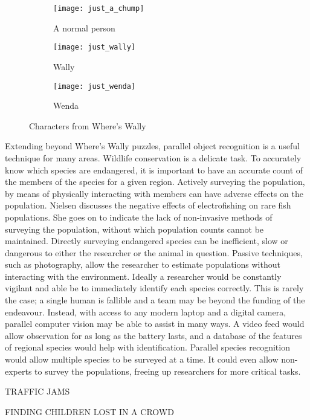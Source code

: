 \documentclass[../main.tex]{subfiles}
\begin{document}
    \begin{figure}[h]
    \centering
      \begin{subfigure}[b]{0.3\textwidth}
        \centering
        \texttt{[image: just\_a\_chump]}   
        \caption{A normal person}
        \label{justachump}
      \end{subfigure}
      \begin{subfigure}[b]{0.3\textwidth}
        \centering
        \texttt{[image: just\_wally]}   
        \caption{Wally}
        \label{justwally}
      \end{subfigure}
      \begin{subfigure}[b]{0.3\textwidth}
        \centering
        \texttt{[image: just\_wenda]}   
        \caption{Wenda}
        \label{justwenda}
      \end{subfigure}
    \caption{Characters from Where's Wally}
    \label{wallychars}
    \end{figure}

    Extending beyond Where's Wally puzzles, parallel object recognition is a useful technique for many areas.
    Wildlife conservation is a delicate task.
    To accurately know which species are endangered, it is important to have an accurate count of the members of the species for a given region.
    Actively surveying the population, by means of physically interacting with members can have adverse effects on the population.
    Nielsen \cite{electrofishing} discusses the negative effects of electrofishing on rare fish populations.
    She goes on to indicate the lack of non-invasive methods of surveying the population, without which population counts cannot be maintained.
    Directly surveying endangered species can be inefficient, slow or dangerous to either the researcher or the animal in question.
    Passive techniques, such as photography, allow the researcher to estimate populations without interacting with the environment.
    Ideally a researcher would be constantly vigilant and able be to immediately identify each species correctly.
    This is rarely the case; a single human is fallible and a team may be beyond the funding of the endeavour.
    Instead, with access to any modern laptop and a digital camera, parallel computer vision may be able to assist in many ways.
    A video feed would allow observation for as long as the battery lasts, and a database of the features of regional species would help with identification.
    Parallel species recognition would allow multiple species to be surveyed at a time.
    It could even allow non-experts to survey the populations, freeing up researchers for more critical tasks.
      
    TRAFFIC JAMS
    
    FINDING CHILDREN LOST IN A CROWD
\end{document}
